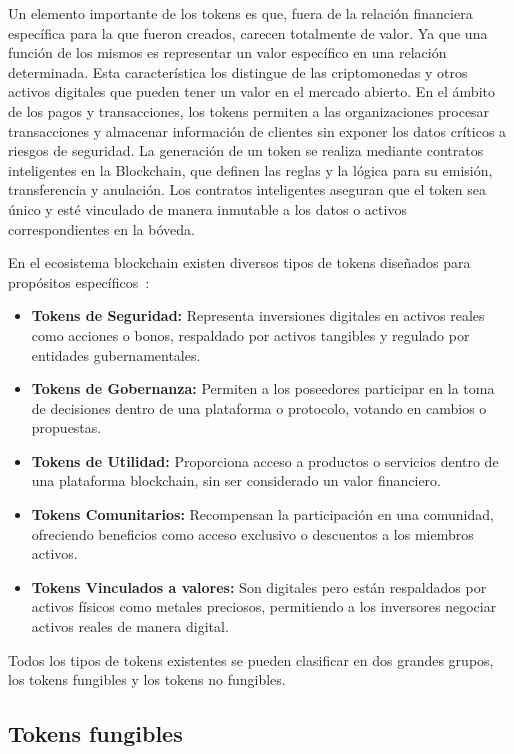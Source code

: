 Un elemento importante de los tokens es que, fuera de la relación financiera específica para la que fueron creados, carecen totalmente de valor. Ya que una función de los mismos es representar un valor específico en una relación determinada. Esta característica los distingue de las criptomonedas y otros activos digitales que pueden tener un valor en el mercado abierto.
En el ámbito de los pagos y transacciones, los tokens permiten a las organizaciones procesar transacciones y almacenar información de clientes sin exponer los datos críticos a riesgos de seguridad.
La generación de un token se realiza mediante contratos inteligentes en la Blockchain, que definen las reglas y la lógica para su emisión, transferencia y anulación. Los contratos inteligentes aseguran que el token sea único y esté vinculado de manera inmutable a los datos o activos correspondientes en la bóveda.

En el ecosistema blockchain existen diversos tipos de tokens diseñados para propósitos específicos~\cite{tiposToken}:

\begin{itemize}
\item \textbf{Tokens de Seguridad:} Representa inversiones digitales en activos reales como acciones o bonos, respaldado por activos tangibles y regulado por entidades gubernamentales.
\item \textbf{Tokens de Gobernanza:} Permiten a los poseedores participar en la toma de decisiones dentro de una plataforma o protocolo, votando en cambios o propuestas.
\item \textbf{Tokens de Utilidad:} Proporciona acceso a productos o servicios dentro de una plataforma blockchain, sin ser considerado un valor financiero.
\item \textbf{Tokens Comunitarios:} Recompensan la participación en una comunidad, ofreciendo beneficios como acceso exclusivo o descuentos a los miembros activos.
\item \textbf{Tokens Vinculados a valores:} Son digitales pero están respaldados por activos físicos como metales preciosos, permitiendo a los inversores negociar activos reales de manera digital.

\end{itemize}

Todos los tipos de tokens existentes se pueden clasificar en dos grandes grupos, los tokens fungibles y los tokens no fungibles.


\subsection{Tokens fungibles}

